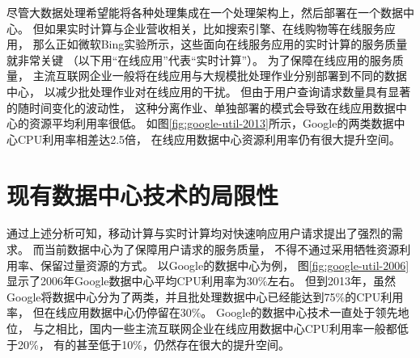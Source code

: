 尽管大数据处理希望能将各种处理集成在一个处理架构上，然后部署在一个数据中心。
但如果实时计算与企业营收相关，比如搜索引擎、在线购物等在线服务应用，
那么正如微软Bing实验所示，这些面向在线服务应用的实时计算的服务质量就非常关键
（以下用``在线应用''代表``实时计算''）。
为了保障在线应用的服务质量，
主流互联网企业一般将在线应用与大规模批处理作业分别部署到不同的数据中心，
以减少批处理作业对在线应用的干扰。
但由于用户查询请求数量具有显著的随时间变化的波动性，
这种分离作业、单独部署的模式会导致在线应用数据中心的资源平均利用率很低。
如图\ref{fig:google-util-2013}所示，Google的两类数据中心CPU利用率相差达2.5倍，
在线应用数据中心资源利用率仍有很大提升空间。




\section{现有数据中心技术的局限性}

通过上述分析可知，移动计算与实时计算均对快速响应用户请求提出了强烈的需求。
而当前数据中心为了保障用户请求的服务质量，
不得不通过采用牺牲资源利用率、保留过量资源的方式。
以Google的数据中心为例，
图\ref{fig:google-util-2006}显示了2006年Google数据中心平均CPU利用率为30\%左右。
但到2013年，虽然Google将数据中心分为了两类，并且批处理数据中心已经能达到75\%的CPU利用率，
但在线应用数据中心仍停留在30\%。
Google的数据中心技术一直处于领先地位，
与之相比，国内一些主流互联网企业在线应用数据中心CPU利用率一般都低于20\%，
有的甚至低于10\%，仍然存在很大的提升空间。


